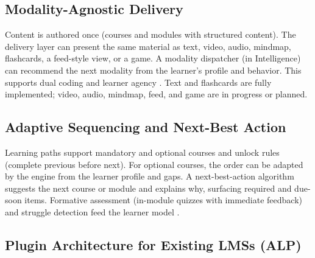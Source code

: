 \documentclass[10pt,twocolumn]{article}
\begin{document}
\subsection{Modality-Agnostic Delivery}
\label{sec:modality}

Content is authored once (courses and modules with structured content). The delivery layer can present the same material as text, video, audio, mindmap, flashcards, a feed-style view, or a game. A modality dispatcher (in Intelligence) can recommend the next modality from the learner's profile and behavior. This supports dual coding and learner agency \cite{mayer2009,clark2016}. Text and flashcards are fully implemented; video, audio, mindmap, feed, and game are in progress or planned.

\subsection{Adaptive Sequencing and Next-Best Action}
\label{sec:adaptive}

Learning paths support mandatory and optional courses and unlock rules (complete previous before next). For optional courses, the order can be adapted by the engine from the learner profile and gaps. A next-best-action algorithm suggests the next course or module and explains why, surfacing required and due-soon items. Formative assessment (in-module quizzes with immediate feedback) and struggle detection feed the learner model \cite{black1998,roediger2006}.

\subsection{Plugin Architecture for Existing LMSs (ALP)}
\label{sec:alp}
\end{document}
